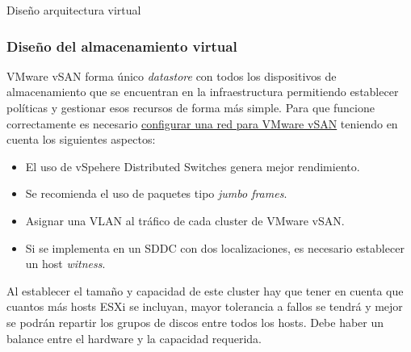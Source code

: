 \begin{subsection}{Diseño arquitectura virtual}
\subsubsection{Diseño del almacenamiento virtual}
VMware vSAN forma único \textit{datastore} con todos los dispositivos de almacenamiento que se encuentran en la infraestructura permitiendo establecer políticas y gestionar esos recursos de forma más simple. Para que funcione correctamente es necesario \underline{configurar una red para VMware vSAN} teniendo en cuenta los siguientes aspectos:
\begin{itemize}
    \item El uso de vSpehere Distributed Switches genera mejor rendimiento.
    \item Se recomienda el uso de paquetes tipo \textit{jumbo frames}.
    \item Asignar una VLAN al tráfico de cada cluster de VMware vSAN.
    \item Si se implementa en un SDDC con dos localizaciones, es necesario establecer un host \textit{witness}.
\end{itemize}
Al establecer el tamaño y capacidad de este cluster hay que tener en cuenta que cuantos más hosts ESXi se incluyan, mayor tolerancia a fallos se tendrá y mejor se podrán repartir los grupos de discos entre todos los hosts. Debe haber un balance entre el hardware y la capacidad requerida.

\end{subsection}
